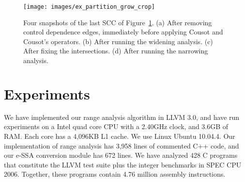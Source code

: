 \documentclass{llncs}
\begin{document}
\begin{figure}[t!]
\begin{center}
\texttt{[image: images/ex\_partition\_grow\_crop]}
\end{center}
\caption{\label{fig:ex_partition_grow_crop}
Four snapshots of the last SCC of Figure~\ref{fig:ex_partition_grow_crop}.
(a) After removing control dependence edges, immediately before applying
Cousot and Cousot's operators.
(b) After running the widening analysis.
(c) After fixing the intersections.
(d) After running the narrowing analysis.}
\end{figure}

%

\section{Experiments}
\label{sec:exp}

We have implemented our range analysis algorithm in LLVM 3.0, and have run
experiments on a Intel quad core CPU with a 2.40GHz clock, and 3.6GB of RAM.
Each core has a 4,096KB L1 cache.
We use Linux Ubuntu 10.04.4.
Our implementation of range analysis has 3,958 lines of
commented C++ code, and our e-SSA conversion module has 672 lines.
We have analyzed 428 C programs that constitute the LLVM test suite plus the
integer benchmarks in SPEC CPU 2006.
Together, these programs contain 4.76 million assembly instructions.
\end{document}
